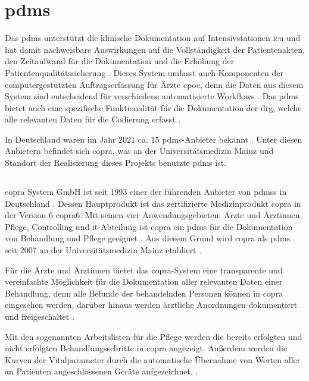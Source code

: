 \section{\acl{pdms}} \label{sec:pdms}

Das \acf{pdms} unterstützt die klinische Dokumentation auf Intensivstationen \glqq\acf{icu}\grqq{} und hat damit nachweisbare Auswirkungen auf die Vollständigkeit der Patientenakten, den Zeitaufwand für die Dokumentation und die Erhöhung der Patientenqualitätssicherung \cite{pdmsfinanc, pdmsimplem, pdmsicu}. Dieses System umfasst auch Komponenten der computergestützten Auftragserfassung für Ärzte \glqq\ac{cpoe}\grqq{}, denn die Daten aus diesem System sind entscheidend für verschiedene automatisierte Workflows \cite{pdmsfinanc, pdmsicu}. Das \ac{pdms} bietet auch eine spezifische Funktionalität für die Dokumentation der \ac{drg}, welche alle relevanten Daten für die Codierung erfasst \cite{pdmsfinanc, pdmsimplem}.

In Deutschland waren im Jahr 2021 ca. 15 \ac{pdms}-Anbieter bekannt \cite{pdmsgermany}. Unter diesen Anbietern befindet sich \acf{copra}, was an der Universitätsmedizin Mainz und Standort der Realisierung dieses Projekts benutzte \ac{pdms} ist.

\subsection{}

\acs{copra} System GmbH ist seit 1993 einer der führenden Anbieter von \acp{pdms} in Deutschland \cite{copradosing, copra}. Dessen Hauptprodukt ist das zertifizierte Medizinprodukt \ac{copra} in der Version 6 \glqq\ac{copra}6\grqq{}. Mit seinen vier Anwendungsgebieten: Ärzte und Ärztinnen, Pflege, Controlling und \ac{it}-Abteilung ist \ac{copra} ein \ac{pdms} für die Dokumentation von Behandlung und Pflege geeignet \cite{copra}. Aus diesem Grund wird \ac{copra} als \ac{pdms} seit 2007 an der Universitätsmedizin Mainz etabliert \cite{copraplaces}.

Für die Ärzte und Ärztinnen bietet das \ac{copra}-System eine transparente und vereinfachte Möglichkeit für die Dokumentation aller relevanten Daten einer Behandlung, denn alle Befunde der behandelnden Personen können in \ac{copra} eingesehen werden, darüber hinaus werden ärztliche Anordnungen dokumentiert und freigeschaltet \cite{copra}.

Mit den sogenannten Arbeitslisten für die Pflege werden die bereits erfolgten und nicht erfolgten Behandlungsschritte in \ac{copra} angezeigt. Außerdem werden die Kurven der Vitalparameter durch die automatische Übernahme von Werten aller an Patienten angeschlossenen Geräte aufgezeichnet. \cite{copra}.

